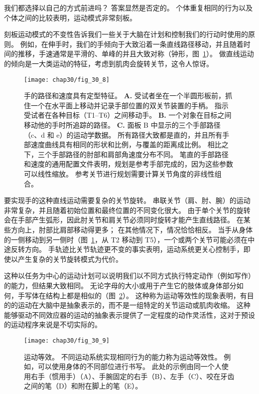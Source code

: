 我们都选择以自己的方式前进吗？
答案显然是否定的。
个体重复相同的行为以及个体之间的比较表明，运动模式非常刻板。


刻板运动模式的不变性告诉我们一些关于大脑在计划和控制我们的行动时使用的原则。
例如，在伸手时，我们的手倾向于大致沿着一条直线路径移动，并且随着时间的推移，手速通常是平滑的、单峰的并且大致对称（钟形，图~\ref{fig:30_8}）。
做直线运动的倾向是一大类运动的特征，考虑到肌肉会旋转关节，这令人惊讶。


\begin{figure}[htbp]
	\centering
	\texttt{[image: chap30/fig\_30\_8]}
	\caption{手的路径和速度具有定型特征\cite{morasso1981spatial}。
		\textbf{A.} 受试者坐在一个半圆形板前，抓住一个在水平面上移动并记录手部位置的双关节装置的手柄。
		指示受试者在各种目标（T1–T6）之间移动手。
		\textbf{B.} 一个对象在目标之间移动他的手时所追踪的路径。
		\textbf{C.} 面板 B 中显示的三个手部路径（c、d 和 e）的运动学数据。
		所有路径大致都是直的，并且所有手部速度曲线具有相同的形状和比例，与覆盖的距离成比例。
		相比之下，三个手部路径的肘部和肩部角速度分布不同。
		笔直的手部路径和速度的通用配置文件表明，规划是参考手部完成的，因为这些参数可以线性缩放。
		参考关节进行规划需要计算关节角度的非线性组合。}
	\label{fig:30_8}
\end{figure}


要实现手的这种直线运动需要复杂的关节旋转。
串联关节（肩、肘、腕）的运动非常复杂，并且随着初始位置和最终位置的不同变化很大。
由于单个关节的旋转会在手部产生弧形，因此肘关节和肩关节必须同时旋转才能产生直线路径。
在某些方向上，肘部比肩部移动得更多；
在其他情况下，情况恰恰相反。
当手从身体的一侧移动到另一侧时（图~\ref{fig:30_8}，从 T2 移动到 T5），一个或两个关节可能必须在中途反转方向。
手轨迹比关节轨迹更不变的事实表明，运动系统更关心控制手，即使以产生复杂的关节旋转模式为代价。


这种以任务为中心的运动计划可以说明我们以不同方式执行特定动作（例如写作）的能力，但结果大致相同。
无论字母的大小或用于产生它的肢体或身体部分如何，手写体在结构上都是相似的（图~\ref{fig:30_9}）。
这种称为运动等效性的现象表明，有目的的运动在大脑中是抽象表示的，而不是一组特定的关节运动或肌肉收缩。
这种能够驱动不同效应器的运动的抽象表示提供了一定程度的动作灵活性，这对于预设的运动程序来说是不切实际的。


\begin{figure}[htbp]
	\centering
	\texttt{[image: chap30/fig\_30\_9]}
	\caption{运动等效。
		不同运动系统实现相同行为的能力称为运动等效性。
		例如，可以使用身体的不同部位进行书写。
		此处的示例由同一个人使用右手（惯用手）（A）、手腕固定的右手（B）、左手（C）、咬在牙齿之间的笔（D）和附在脚上的笔（E）。}
	\label{fig:30_9}
\end{figure}



